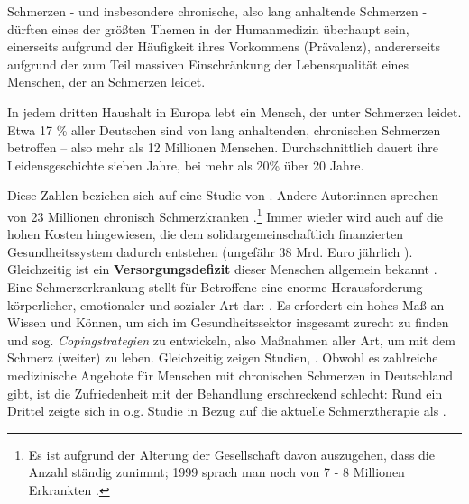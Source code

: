 \documentclass[
  twoside,
  parskip=half-,
]{scrreprt}
\begin{document}
  Schmerzen - und insbesondere chronische, also lang anhaltende Schmerzen - dürften eines der größten Themen in der Humanmedizin überhaupt sein, einerseits aufgrund der Häufigkeit ihres Vorkommens (Prävalenz), andererseits aufgrund der zum Teil massiven Einschränkung der Lebensqualität eines Menschen, der an Schmerzen leidet. 
  
  \begin{displayquote}
    In jedem dritten Haushalt in Europa lebt ein Mensch, der unter Schmerzen leidet. Etwa 17 \% aller Deutschen sind von lang anhaltenden, chronischen Schmerzen betroffen – also mehr als 12 Millionen Menschen. Durchschnittlich dauert ihre Leidensgeschichte sieben Jahre, bei mehr als 20\% über 20 Jahre.
  \end{displayquote}
  
  Diese Zahlen beziehen sich auf eine Studie von \textcite{HeftSchmerz28}.
    Andere Autor:innen sprechen von 23 Millionen chronisch Schmerzkranken \autocite[vgl.][4]{wachter}.\footnote{Es ist aufgrund der Alterung der Gesellschaft davon auszugehen, dass die Anzahl ständig zunimmt; 1999 sprach man noch von 7 - 8 Millionen Erkrankten \autocite[vgl.][17]{glier}.}
    Immer wieder wird auch auf die hohen Kosten hingewiesen, die dem solidargemeinschaftlich finanzierten Gesundheitssystem dadurch entstehen (ungefähr 38 Mrd. Euro jährlich \autocite[vgl.][]{Schmerzgesellschaft}).
    Gleichzeitig ist ein \textbf{Versorgungsdefizit} dieser Menschen allgemein bekannt \autocite[vgl.][]{Nachbessern}.
    Eine Schmerzerkrankung stellt für Betroffene eine enorme Herausforderung körperlicher, emotionaler und sozialer Art dar: . Es erfordert ein hohes Maß an Wissen und Können, um sich im Gesundheitssektor insgesamt zurecht zu finden und sog. \textit{Copingstrategien} zu entwickeln, also Maßnahmen aller Art, um mit dem Schmerz (weiter) zu leben.
    Gleichzeitig zeigen Studien, .
    Obwohl es zahlreiche medizinische Angebote für Menschen mit chronischen Schmerzen in Deutschland gibt, ist die Zufriedenheit mit der Behandlung erschreckend schlecht:
    Rund ein Drittel zeigte sich in o.g. Studie in Bezug auf die aktuelle Schmerztherapie als  \autocite[vgl.][]{HeftSchmerz28}.
\end{document}

